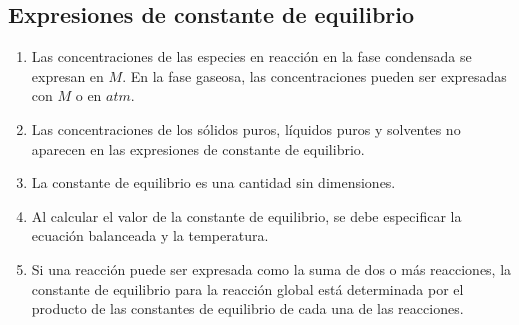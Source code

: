     \subsection{Expresiones de constante de equilibrio}
        \begin{enumerate} \item Las concentraciones de las especies en reacción en la fase condensada se expresan en $M$. En la fase gaseosa, las concentraciones pueden ser expresadas con $M$ o en $atm$. \item Las concentraciones de los sólidos puros, líquidos puros y solventes no aparecen en las expresiones de constante de equilibrio. \item La constante de equilibrio es una cantidad sin dimensiones. \item Al calcular el valor de la constante de equilibrio, se debe especificar la ecuación balanceada y la temperatura. \item Si una reacción puede ser expresada como la suma de dos o más reacciones, la constante de equilibrio para la reacción global está determinada por el producto de las constantes de equilibrio de cada una de las reacciones. \end{enumerate} 
